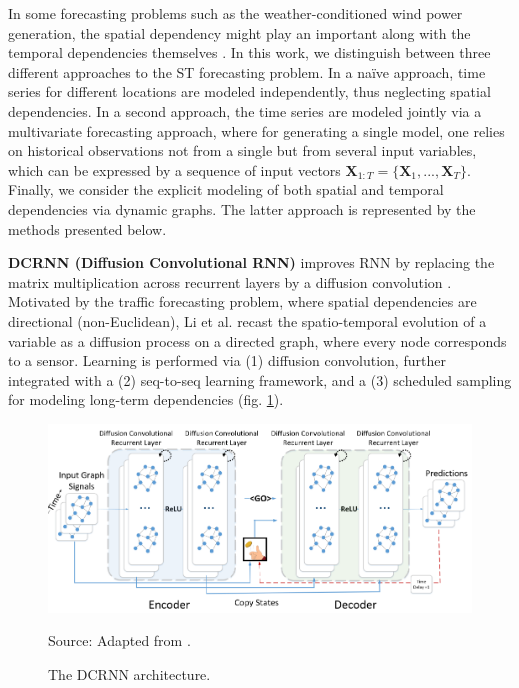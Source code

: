 In some forecasting problems such as the weather-conditioned wind power generation, the spatial dependency might play an important along with the temporal dependencies themselves \cite{engeland2017variability}.
In this work, we distinguish between three different approaches to the ST forecasting problem.
In a naïve approach, time series for different locations are modeled independently, thus neglecting spatial dependencies.
In a second approach, the time series are modeled jointly via a multivariate forecasting approach, where for generating a single model, one relies on historical observations not from a single but from several input variables, which can be expressed by a sequence of input vectors $\boldsymbol{X}_{1:T} = \{\boldsymbol{X}_1, ..., \boldsymbol{X}_T\}$.
Finally, we consider the explicit modeling of both spatial and temporal dependencies via dynamic graphs.
The latter approach is represented by the methods presented below.

\vspace{1em}
\noindent
\textbf{DCRNN (Diffusion Convolutional RNN)} improves RNN by replacing the matrix multiplication across recurrent layers by a diffusion convolution \cite{liu2020intro}.
Motivated by the traffic forecasting problem, where spatial dependencies are directional (non-Euclidean), Li et al. \cite{li2018dcrnn} recast the spatio-temporal evolution of a variable as a diffusion process on a directed graph, where every node corresponds to a sensor.
Learning is performed via (1) diffusion convolution, further integrated with a (2) seq-to-seq learning framework, and a (3) scheduled sampling for modeling long-term dependencies (fig. \ref{fig:dcrnn}).
\begin{figure}[H]
   \centering
   \caption{The DCRNN architecture.}
   \includegraphics[scale=0.45]{dcrnn.png}  \\
    \raggedright
    Source: Adapted from \cite{li2018dcrnn}.
   \label{fig:dcrnn}
\end{figure}

